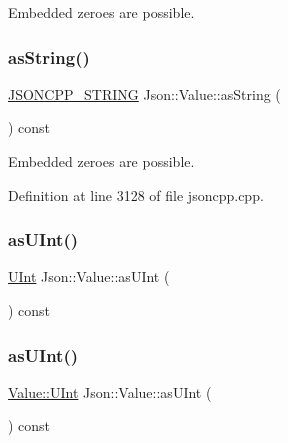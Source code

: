 Embedded zeroes are possible. 

\hypertarget{class_json_1_1_value_ae3f9b0d38f820ccdd8888aa92ea6e792}{}\label{class_json_1_1_value_ae3f9b0d38f820ccdd8888aa92ea6e792} 
\subsubsection{\texorpdfstring{as\+String()}{asString()}\hspace{0.1cm}{\footnotesize\ttfamily [2/2]}}
{\footnotesize\ttfamily \hyperlink{config_8h_a1e723f95759de062585bc4a8fd3fa4be}{J\+S\+O\+N\+C\+P\+P\+\_\+\+S\+T\+R\+I\+NG} Json\+::\+Value\+::as\+String (\begin{DoxyParamCaption}{ }\end{DoxyParamCaption}) const}



Embedded zeroes are possible. 



Definition at line 3128 of file jsoncpp.\+cpp.

\hypertarget{class_json_1_1_value_adc7664c2bd414766050eb3fe0eec5232}{}\label{class_json_1_1_value_adc7664c2bd414766050eb3fe0eec5232} 
\subsubsection{\texorpdfstring{as\+U\+Int()}{asUInt()}\hspace{0.1cm}{\footnotesize\ttfamily [1/2]}}
{\footnotesize\ttfamily \hyperlink{class_json_1_1_value_a0933d59b45793ae4aade1757c322a98d}{U\+Int} Json\+::\+Value\+::as\+U\+Int (\begin{DoxyParamCaption}{ }\end{DoxyParamCaption}) const}

\hypertarget{class_json_1_1_value_a74b305583ec3aacf4f9dd06e799dc265}{}\label{class_json_1_1_value_a74b305583ec3aacf4f9dd06e799dc265} 
\subsubsection{\texorpdfstring{as\+U\+Int()}{asUInt()}\hspace{0.1cm}{\footnotesize\ttfamily [2/2]}}
{\footnotesize\ttfamily \hyperlink{class_json_1_1_value_a0933d59b45793ae4aade1757c322a98d}{Value\+::\+U\+Int} Json\+::\+Value\+::as\+U\+Int (\begin{DoxyParamCaption}{ }\end{DoxyParamCaption}) const}



